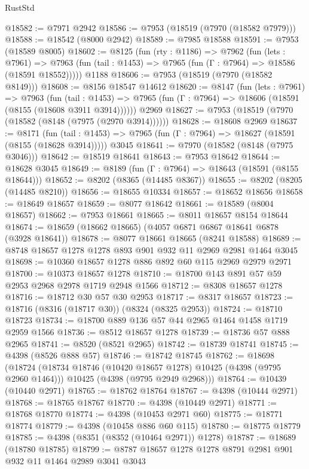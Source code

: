 \begin{lexlean}{RustStd}
\begin{coremodule}
@18582 := @7971 @2942
@18586 := @7953 (@18519 (@7970 (@18582 @7979)))
@18588 := @18542 (@8000 @2942)
@18589 := @7985 @18588
@18591 := @7953 (@18589 @8005)
@18602 := @8125
    (fun (rty : @1186) =>
    @7962
      (fun (lets : @7961) =>
      @7963 (fun (tail : @1453) => @7965 (fun (Γ : @7964) => @18586 (@18591 @18552)))))
    @1188
@18606 := @7953 (@18519 (@7970 (@18582 @8149)))
@18608 := @8156 @18547 @14612
@18620 := @8147
    (fun (lets : @7961) =>
    @7963
      (fun (tail : @1453) =>
      @7965 (fun (Γ : @7964) => @18606 (@18591 (@8155 (@18608 @3911 @3914))))))
    @2969
@18627 := @7953 (@18519 (@7970 (@18582 (@8148 (@7975 (@2970 @3914))))))
@18628 := @18608 @2969
@18637 := @8171
    (fun (tail : @1453) => @7965 (fun (Γ : @7964) => @18627 (@18591 (@8155 (@18628 @3914)))))
    @3045
@18641 := @7970 (@18582 (@8148 (@7975 @3046)))
@18642 := @18519 @18641
@18643 := @7953 @18642
@18644 := @18628 @3045
@18649 := @8189 (fun (Γ : @7964) => @18643 (@18591 (@8155 @18644)))
@18652 := @8202 (@8365 (@14485 @8367))
@18655 := @8202 (@8205 (@14485 @8210))
@18656 := @18655 @10334
@18657 := @18652 @18656
@18658 := @18649 @18657
@18659 := @8077 @18642
@18661 := @18589 (@8004 @18657)
@18662 := @7953 @18661
@18665 := @8011 @18657 @8154 @18644
@18674 := @18659 (@18662 @18665) (@4057 @6871 @6867 @18641 @6878 (@3928 @18641))
@18678 := @8077 @18661 @18665 (@8241 @18588)
@18689 := @8748 @18657 @1278 @1278 @893 @901 @932 @11 @2969 @2981 @1464 @3045
@18698 := @10360 @18657 @1278 @886 @892 @60 @115 @2969 @2979 @2971
@18700 := @10373 @18657 @1278
@18710 := @18700 @143 @891 @57 @59 @2953 @2968 @2978 @1719 @2948 @1566
@18712 := @8308 @18657 @1278
@18716 := @18712 @30 @57 @30 @2953
@18717 := @8317 @18657
@18723 := @18716 (@8316 (@18717 @30)) (@8324 (@8325 @2953))
@18724 := @18710 @18723
@18734 := @18700 @889 @136 @57 @44 @2965 @1464 @1458 @1719 @2959 @1566
@18736 := @8512 @18657 @1278
@18739 := @18736 @57 @888 @2965
@18741 := @8520 (@8521 @2965)
@18742 := @18739 @18741
@18745 := @4398 (@8526 @888 @57)
@18746 := @18742 @18745
@18762 := @18698
    (@18724
      (@18734 @18746 (@10420 @18657 @1278) @10425 (@4398 (@9795 @2960 @1464)))
      @10425
      (@4398 (@9795 @2949 @2968)))
@18764 := @10439 (@10440 @2971)
@18765 := @18762 @18764
@18767 := @4398 (@10444 @2971)
@18768 := @18765 @18767
@18770 := @4398 (@10449 @2971)
@18771 := @18768 @18770
@18774 := @4398 (@10453 @2971 @60)
@18775 := @18771 @18774
@18779 := @4398 (@10458 @886 @60 @115)
@18780 := @18775 @18779
@18785 := @4398 (@8351 (@8352 (@10464 @2971)) @1278)
@18787 := @18689 (@18780 @18785)
@18799 := @8787 @18657 @1278 @1278 @8791 @2981 @901 @932 @11 @1464 @2989 @3041 @3043

\end{coremodule}
\end{lexlean}
